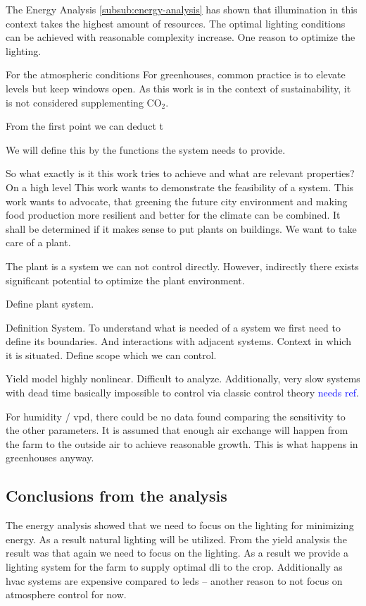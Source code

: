 The Energy Analysis \ref{subsub:energy-analysis} has shown that illumination in this context takes the highest amount of resources.
The optimal lighting conditions can be achieved with reasonable complexity increase.
One reason to optimize the lighting.

For the atmospheric conditions
For greenhouses, common practice is to elevate levels but keep windows open.
As this work is in the context of sustainability, it is not considered supplementing CO$_2$.

From the first point we can deduct t

We will define this by the functions the system needs to provide.

So what exactly is it this work tries to achieve and what are relevant properties?
On a high level
This work wants to demonstrate the feasibility of a system.
This work wants to advocate, that greening the future city environment and making food production more resilient and better for the climate can be combined.
It shall be determined if it makes sense to put plants on buildings.
We want to take care of a plant.

The plant is a system we can not control directly.
However, indirectly there exists significant potential to optimize the plant environment.

Define plant system.

Definition System.
To understand what is needed of a system we first need to define its boundaries.
And interactions with adjacent systems.
Context in which it is situated.
Define scope which we can control.

Yield model highly nonlinear.
Difficult to analyze.
Additionally, very slow systems with dead time basically impossible to control via classic control theory \textcolor{Blue}{needs ref}.

For humidity / vpd, there could be no data found comparing the sensitivity to the other parameters.
It is assumed that enough air exchange will happen from the farm to the outside air to achieve reasonable growth.
This is what happens in greenhouses anyway.

\subsection{Conclusions from the analysis}
\label{sub:conc-analysis}
The energy analysis showed that we need to focus on the lighting for minimizing energy.
As a result natural lighting will be utilized.
From the yield analysis the result was that again we need to focus on the lighting.
As a result we provide a lighting system for the farm to supply optimal \ac{dli} to the crop.
Additionally as \ac{hvac} systems are expensive compared to \acp{led} -- another reason to not focus on atmosphere control for now.

